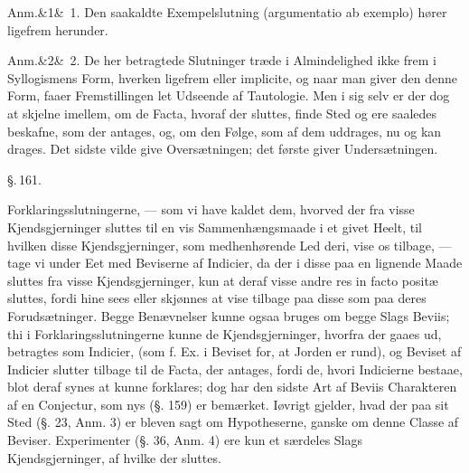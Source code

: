 \documentclass[12pt]{book}
\def\sperr#1{#1}%
\def\textit#1{#1}%
\def\emph#1{#1}%
\newcommand{\sperr}[1]{\textls[180]{#1}}
\newcommand{\parag}[1]{%
  \par\vspace{0.9\baselineskip}%
  {\centering\textit{\S.\,#1.}\par}%
  \vspace{0.35\baselineskip}%
  \noindent\hspace{\parindent}\ignorespaces
}
\newcommand{\anm}[1]{%
  \par\vspace{0.5\baselineskip}%
  \noindent\hspace{\parindent}\sperr{Anm.}\ifx&#1&\else~\textit{#1}.\fi
  \enspace\ignorespaces
}
\newcommand{\opage}[1]{\marginnote{\footnotesize\textit{[#1]}}}
\begin{document}
\anm{1} Den saakaldte \emph{Exempelslutning} (\textit{argumentatio ab exemplo})
hører ligefrem herunder.

\anm{2} De her betragtede Slutninger træde i Almindelighed ikke frem i
Syllogismens Form, hverken ligefrem eller \textit{implicite}, og naar man giver
den denne Form, faaer Fremstillingen let Udseende af Tautologie. Men i sig selv
er der dog at skjelne imellem, om de Facta, hvoraf der sluttes, finde Sted og
ere saaledes beskafne, som der antages, og, om den Følge, som af dem uddrages,
nu og kan drages. Det sidste vilde give Oversætningen; det første giver
Undersætningen.

\parag{161}

Forklaringsslutningerne, --- som vi have kaldet dem, hvorved der fra visse
Kjendsgjerninger sluttes til en vis Sammenhængsmaade i et
\opage{355} givet Heelt, til hvilken disse Kjendsgjerninger, som medhenhørende Led deri,
vise os tilbage, --- tage vi under Eet med Beviserne af Indicier, da der i disse
paa en lignende Maade sluttes fra visse Kjendsgjerninger, kun at deraf visse
andre \textit{res in facto positæ} sluttes, fordi hine sees eller skjønnes at
vise tilbage paa disse som paa deres Forudsætninger. Begge Benævnelser kunne
ogsaa bruges om begge Slags Beviis; thi i Forklaringsslutningerne kunne de
Kjendsgjerninger, hvorfra der gaaes ud, betragtes som Indicier, (som f. Ex. i
Beviset for, at Jorden er rund), og Beviset af Indicier slutter tilbage til de
Facta, der antages, fordi de, hvori Indicierne bestaae, blot deraf synes at
kunne forklares; dog har den sidste Art af Beviis Charakteren af en Conjectur,
som nys (§. 159) er bemærket. Iøvrigt gjelder, hvad der paa sit Sted (§. 23,
Anm. 3) er bleven sagt om Hypotheserne, ganske om denne Classe af Beviser.
\emph{Experimenter} (§. 36, Anm. 4) ere kun et særdeles Slags Kjendsgjerninger,
af hvilke der sluttes.
\end{document}
